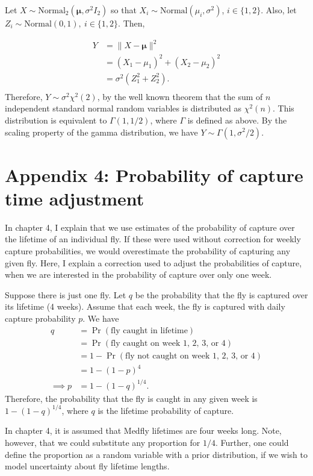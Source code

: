 \documentclass[
  oneside]{book}
\begin{document}
Let \(X \sim \mathrm {Normal}_2 (\pmb \mu, \sigma^2 I_2)\) so that \(X_i \sim \mathrm{Normal}(\mu_i, \sigma^2)\), \(i \in \{1, 2\}\). Also, let \(Z_i \sim \mathrm{Normal}(0, 1), ~ i \in \{1, 2\}\). Then,

\[
\begin{aligned}
  Y &= \lVert X - \pmb \mu \rVert^2  \\
    &= (X_1 - \mu_1)^2 + (X_2 - \mu_2)^2 \\
    &= \sigma^2 (Z_1^2 + Z_2^2). \\
\end{aligned}
\]
Therefore, \(Y \sim \sigma^2 \chi^2(2)\), by the well known theorem that the sum of \(n\) independent standard normal random variables is distributed as \(\chi^2(n)\). This distribution is equivalent to \(\Gamma(1, 1/2)\), where \(\Gamma\) is defined as above. By the scaling property of the gamma distribution, we have \(Y \sim \Gamma(1, \sigma^2 / 2)\).

\hypertarget{appendix-4-probability-of-capture-time-adjustment}{%
\section{Appendix 4: Probability of capture time adjustment}\label{appendix-4-probability-of-capture-time-adjustment}}

In chapter 4, I explain that we use estimates of the probability of capture over the lifetime of an individual fly. If these were used without correction for weekly capture probabilities, we would overestimate the probability of capturing any given fly. Here, I explain a correction used to adjust the probabilities of capture, when we are interested in the probability of capture over only one week.

Suppose there is just one fly. Let \(q\) be the probability that the fly is captured over its lifetime (4 weeks). Assume that each week, the fly is captured with daily capture probability \(p\). We have
\[
\begin{aligned}
  q &= \Pr(\text{fly caught in lifetime}) \\
    &= \Pr(\text{fly caught on week 1, 2, 3, or 4}) \\
    &= 1 - \Pr(\text{fly not caught on week 1, 2, 3, or 4}) \\
    &= 1 - (1 - p)^{4} \\
    \implies p &= 1 - (1-q)^{1/4}.
\end{aligned}
\]
Therefore, the probability that the fly is caught in any given week is \(1 - (1 - q)^{1/4}\), where \(q\) is the lifetime probability of capture.

In chapter 4, it is assumed that Medfly lifetimes are four weeks long. Note, however, that we could substitute any proportion for \(1/4\). Further, one could define the proportion as a random variable with a prior distribution, if we wish to model uncertainty about fly lifetime lengths.

  
\end{document}
